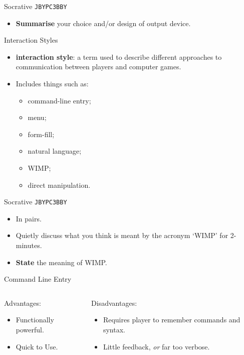 \begin{frame}[fragile]{Socrative \texttt{JBYPC3BBY}}
	\begin{itemize}
		\item \textbf{Summarise} your choice and/or design of output device.
	\end{itemize}
\end{frame}

\begin{frame}{Interaction Styles}
	\begin{itemize}
		\item \textbf{interaction style}: a term used to describe different approaches to communication between players and computer games.
		\item Includes things such as: 
		\begin{itemize}
			\item command-line entry;
			\item menu;
			\item form-fill;
			\item natural language;
			\item WIMP;
			\item direct manipulation.
		\end{itemize}
	\end{itemize}
\end{frame}

\begin{frame}[fragile]{Socrative \texttt{JBYPC3BBY}}
	\begin{itemize}
		\item In pairs.
		\item Quietly discuss what you think is meant by the acronym `WIMP' for 2-minutes.
		\item \textbf{State} the meaning of WIMP.
	\end{itemize}
\end{frame}

\begin{frame}{Command Line Entry}
	\begin{columns}[onlytextwidth]
		\begin{column}{0.45\textwidth}
			Advantages:
	
			\begin{itemize}
				\item Functionally powerful.
				\item Quick to Use.
			\end{itemize}
		\end{column}
		\begin{column}{0.45\textwidth}
			Disadvantages:
	
			\begin{itemize}
				\item Requires player to remember commands and syntax.
				\item Little feedback, \textit{or} far too verbose.
			\end{itemize}
		\end{column}
	\end{columns}	
\end{frame}

